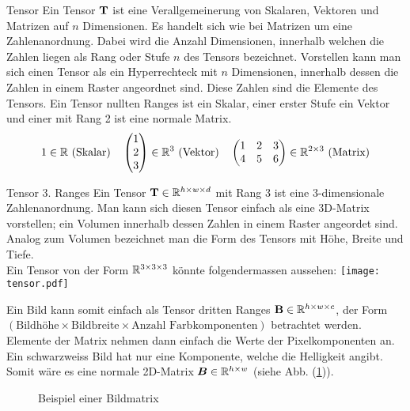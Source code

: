 \begin{defbox}{Tensor}
  Ein Tensor $\ten{T}$ ist eine Verallgemeinerung von Skalaren, Vektoren und Matrizen auf
  $n$ Dimensionen. Es handelt sich wie bei Matrizen um
  eine Zahlenanordnung. Dabei wird die Anzahl Dimensionen, innerhalb welchen die
  Zahlen liegen als Rang oder Stufe $n$ des Tensors bezeichnet. Vorstellen kann man sich einen Tensor
  als ein Hyperrechteck mit $n$ Dimensionen, innerhalb dessen die Zahlen in
  einem Raster angeordnet sind. Diese Zahlen sind die Elemente des Tensors.
  Ein Tensor nullten Ranges ist ein Skalar, einer erster Stufe ein Vektor und
  einer mit Rang 2 ist eine normale Matrix.
  \begin{gather*}
    1 \in \set{R} \text{ (Skalar)} \quad \begin{pmatrix} 1 \\ 2 \\ 3 \end{pmatrix}
    \in \set{R}^3 \text{ (Vektor)} \quad
    \begin{pmatrix}
      1 & 2 & 3 \\
      4 & 5 & 6 \\
    \end{pmatrix} \in \set{R}^{2 \times 3} \text{ (Matrix)}
  \end{gather*}
\end{defbox}

\begin{defbox}{Tensor 3. Ranges}
  Ein Tensor $\ten{T} \in \set{R}^{h \times w \times d}$ mit Rang 3 ist eine 3-dimensionale Zahlenanordnung. Man kann sich
  diesen Tensor einfach als eine 3D-Matrix vorstellen; ein Volumen innerhalb
  dessen Zahlen in einem Raster angeordet sind.
  Analog zum Volumen bezeichnet man die Form des Tensors mit Höhe, Breite und
  Tiefe. \\
  Ein Tensor von der Form $\set{R}^{3 \times 3 \times 3}$ könnte folgendermassen
  aussehen:
  \para{}
  \texttt{[image: tensor.pdf]}

\end{defbox}
\para{}
Ein Bild kann somit einfach als Tensor dritten Ranges $\ten{B} \in \set{R}^{h
  \times w \times c}$, der Form $(\text{Bildhöhe} \times \text{Bildbreite}
\times \text{Anzahl Farbkomponenten})$ betrachtet werden.
Elemente der Matrix nehmen dann einfach die Werte der Pixelkomponenten an.
Ein schwarzweiss Bild hat nur eine Komponente, welche die Helligkeit angibt.
Somit wäre es eine normale 2D-Matrix $\mat{B} \in \set{R}^{h \times w}$ (siehe
Abb. (\ref{fig:bildmatrix})).
\para{}
\begin{figure}[h!]
  \begin{tikzpicture}

  \end{tikzpicture}
  \caption{Beispiel einer Bildmatrix}
  \label{fig:bildmatrix}
\end{figure}


